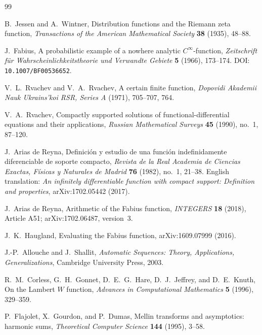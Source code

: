 \documentclass[11pt]{article}
\theoremstyle{definition}
\theoremstyle{remark}
\begin{document}
\begin{thebibliography}{99}

B.~Jessen and A.~Wintner,
\newblock Distribution functions and the Riemann zeta function,
\newblock \emph{Transactions of the American Mathematical Society}
\textbf{38} (1935), 48--88.

J.~Fabius,
\newblock A probabilistic example of a nowhere analytic $C^\infty$-function,
\newblock \emph{Zeitschrift f\"ur Wahrscheinlichkeitstheorie und Verwandte Gebiete}
\textbf{5} (1966), 173--174.
\newblock DOI: \nolinkurl{10.1007/BF00536652}.

V.~L.~Rvachev and V.~A.~Rvachev,
\newblock A certain finite function,
\newblock \emph{Dopovidi Akademii Nauk Ukrains'koi RSR, Series A}
(1971), 705--707, 764.

V.~A.~Rvachev,
\newblock Compactly supported solutions of functional-differential equations and their
applications,
\newblock \emph{Russian Mathematical Surveys} \textbf{45} (1990), no.~1, 87--120.

J.~Arias de Reyna,
\newblock Definici\'on y estudio de una funci\'on indefinidamente diferenciable de soporte
compacto,
\newblock \emph{Revista de la Real Academia de Ciencias Exactas, F\'isicas y Naturales de
Madrid} \textbf{76} (1982), no.~1, 21--38.
\newblock English translation: \emph{An infinitely differentiable function with compact
support: Definition and properties}, arXiv:1702.05442 (2017).

J.~Arias de Reyna,
\newblock Arithmetic of the Fabius function,
\newblock \emph{INTEGERS} \textbf{18} (2018), Article A51; arXiv:1702.06487, version~3.

J.~K.~Haugland,
\newblock Evaluating the Fabius function,
\newblock arXiv:1609.07999 (2016).

J.-P.~Allouche and J.~Shallit,
\newblock \emph{Automatic Sequences: Theory, Applications, Generalizations},
\newblock Cambridge University Press, 2003.

R.~M.~Corless, G.~H.~Gonnet, D.~E.~G.~Hare, D.~J.~Jeffrey, and D.~E.~Knuth,
\newblock On the Lambert $W$ function,
\newblock \emph{Advances in Computational Mathematics} \textbf{5} (1996), 329--359.

P.~Flajolet, X.~Gourdon, and P.~Dumas,
\newblock Mellin transforms and asymptotics: harmonic sums,
\newblock \emph{Theoretical Computer Science} \textbf{144} (1995), 3--58.


\end{thebibliography}
\end{document}
